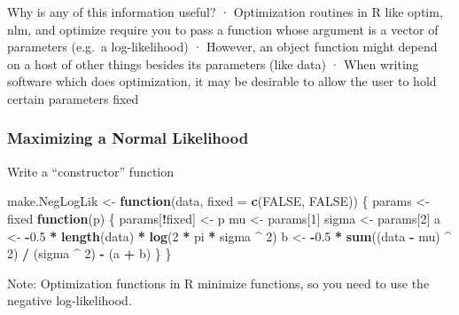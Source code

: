\documentclass[
]{article}
\newenvironment{Shaded}{\begin{snugshade}}{\end{snugshade}}
\newcommand{\AttributeTok}[1]{\textcolor[rgb]{0.13,0.29,0.53}{#1}}
\newcommand{\ConstantTok}[1]{\textcolor[rgb]{0.56,0.35,0.01}{#1}}
\newcommand{\ControlFlowTok}[1]{\textcolor[rgb]{0.13,0.29,0.53}{\textbf{#1}}}
\newcommand{\DecValTok}[1]{\textcolor[rgb]{0.00,0.00,0.81}{#1}}
\newcommand{\FloatTok}[1]{\textcolor[rgb]{0.00,0.00,0.81}{#1}}
\newcommand{\FunctionTok}[1]{\textcolor[rgb]{0.13,0.29,0.53}{\textbf{#1}}}
\newcommand{\NormalTok}[1]{#1}
\newcommand{\OtherTok}[1]{\textcolor[rgb]{0.56,0.35,0.01}{#1}}
\newcommand{\SpecialCharTok}[1]{\textcolor[rgb]{0.81,0.36,0.00}{\textbf{#1}}}
\begin{document}
Why is any of this information useful? · Optimization routines in R like
optim, nlm, and optimize require you to pass a function whose argument
is a vector of parameters (e.g.~a log-likelihood) · However, an object
function might depend on a host of other things besides its parameters
(like data) · When writing software which does optimization, it may be
desirable to allow the user to hold certain parameters fixed

\hypertarget{maximizing-a-normal-likelihood}{%
\subsubsection{Maximizing a Normal
Likelihood}\label{maximizing-a-normal-likelihood}}

Write a ``constructor'' function

\begin{Shaded}
\begin{Highlighting}[]
\NormalTok{make.NegLogLik }\OtherTok{\textless{}{-}}
  \ControlFlowTok{function}\NormalTok{(data, }\AttributeTok{fixed =} \FunctionTok{c}\NormalTok{(}\ConstantTok{FALSE}\NormalTok{, }\ConstantTok{FALSE}\NormalTok{)) \{}
\NormalTok{    params }\OtherTok{\textless{}{-}}\NormalTok{ fixed}
    \ControlFlowTok{function}\NormalTok{(p) \{}
\NormalTok{      params[}\SpecialCharTok{!}\NormalTok{fixed] }\OtherTok{\textless{}{-}}\NormalTok{ p}
\NormalTok{      mu }\OtherTok{\textless{}{-}}\NormalTok{ params[}\DecValTok{1}\NormalTok{]}
\NormalTok{      sigma }\OtherTok{\textless{}{-}}\NormalTok{ params[}\DecValTok{2}\NormalTok{]}
\NormalTok{      a }\OtherTok{\textless{}{-}} \SpecialCharTok{{-}}\FloatTok{0.5} \SpecialCharTok{*} \FunctionTok{length}\NormalTok{(data) }\SpecialCharTok{*} \FunctionTok{log}\NormalTok{(}\DecValTok{2} \SpecialCharTok{*}\NormalTok{ pi }\SpecialCharTok{*}\NormalTok{ sigma }\SpecialCharTok{\^{}} \DecValTok{2}\NormalTok{) }
\NormalTok{      b }\OtherTok{\textless{}{-}} \SpecialCharTok{{-}}\FloatTok{0.5} \SpecialCharTok{*} \FunctionTok{sum}\NormalTok{((data }\SpecialCharTok{{-}}\NormalTok{ mu) }\SpecialCharTok{\^{}} \DecValTok{2}\NormalTok{) }\SpecialCharTok{/}\NormalTok{ (sigma }\SpecialCharTok{\^{}} \DecValTok{2}\NormalTok{) }
      \SpecialCharTok{{-}}\NormalTok{ (a }\SpecialCharTok{+}\NormalTok{ b)}
\NormalTok{    \}}
\NormalTok{  \}}
\end{Highlighting}
\end{Shaded}

Note: Optimization functions in R minimize functions, so you need to use
the negative log-likelihood.
\end{document}
